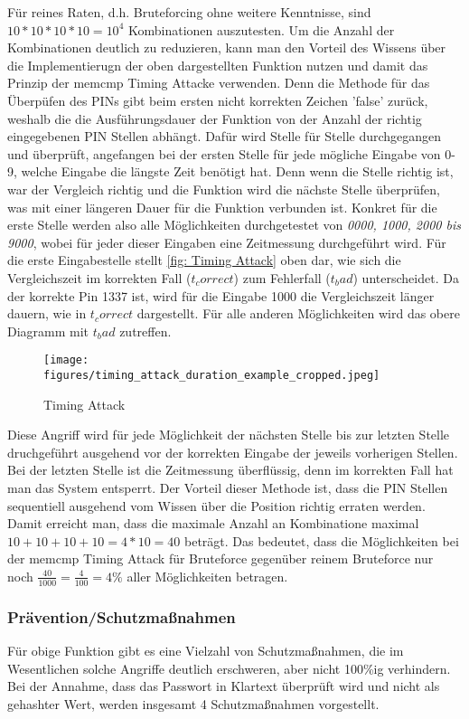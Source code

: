\documentclass[a4paper,
DIV=13,
12pt,
BCOR=10mm,
department=FakIM,
oneside,
parskip=half,
automark,
listof=totocnumbered,
bibliography=totocnumbered,
acronym=totocnumbered
] {OTHRartcl}
\begin{document}
Für reines Raten, d.h. Bruteforcing ohne weitere Kenntnisse, sind $ 10*10*10*10 = 10^4 $ Kombinationen auszutesten.
Um die Anzahl der Kombinationen deutlich zu reduzieren, kann man den Vorteil des Wissens über die Implementierugn der oben dargestellten Funktion nutzen und damit das Prinzip der memcmp Timing Attacke verwenden.
Denn die Methode für das Überpüfen des PINs gibt beim ersten nicht korrekten Zeichen 'false' zurück, weshalb die die Ausführungsdauer der
Funktion von der Anzahl der richtig eingegebenen PIN Stellen abhängt.
Dafür wird Stelle für Stelle durchgegangen und überprüft, angefangen bei der ersten Stelle für jede mögliche Eingabe von 0-9, welche Eingabe die längste Zeit benötigt hat.
Denn wenn die Stelle richtig ist, war der Vergleich richtig und die Funktion wird die nächste Stelle überprüfen, was mit einer längeren Dauer für die Funktion
verbunden ist.
Konkret für die erste Stelle werden also alle Möglichkeiten durchgetestet von \textit{0000, 1000, 2000 bis 9000}, wobei für jeder dieser Eingaben
eine Zeitmessung durchgeführt wird.
Für die erste Eingabestelle stellt \autoref{fig: Timing Attack} oben dar, wie sich die Vergleichszeit im
korrekten Fall ($t_correct$) zum Fehlerfall ($t_bad$) unterscheidet.
Da der korrekte Pin 1337 ist, wird für die Eingabe 1000 die Vergleichszeit länger dauern, wie in $t_correct$ dargestellt.
Für alle anderen Möglichkeiten wird das obere Diagramm mit $t_bad$ zutreffen.
\begin{figure}[ht!]
  \begin{center}
    \texttt{[image: figures/timing\_attack\_duration\_example\_cropped.jpeg]}
    \caption{Timing Attack}
    \label{fig: Timing Attack}
  \end{center}
\end{figure}
Diese Angriff wird für jede Möglichkeit der nächsten Stelle bis zur letzten Stelle druchgeführt ausgehend vor der korrekten Eingabe der jeweils vorherigen Stellen.
Bei der letzten Stelle ist die Zeitmessung überflüssig, denn im korrekten Fall hat man das System entsperrt.
Der Vorteil dieser Methode ist, dass die PIN Stellen sequentiell ausgehend vom Wissen über die Position richtig erraten werden.
Damit erreicht man, dass die maximale Anzahl an Kombinatione maximal $10+10+10+10 = 4*10 = 40 $ beträgt.
Das bedeutet, dass die Möglichkeiten bei der memcmp Timing Attack für Bruteforce gegenüber reinem Bruteforce nur noch $\frac{40}{1000} = \frac{4}{100} = 4\% $
aller Möglichkeiten betragen.

\subsubsection{Prävention/Schutzmaßnahmen}
Für obige Funktion gibt es eine Vielzahl von Schutzmaßnahmen, die im Wesentlichen solche Angriffe deutlich erschweren, aber nicht 100\%ig verhindern.
Bei der Annahme, dass das Passwort in Klartext überprüft wird und nicht als gehashter Wert, werden insgesamt 4 Schutzmaßnahmen vorgestellt.
\end{document}
